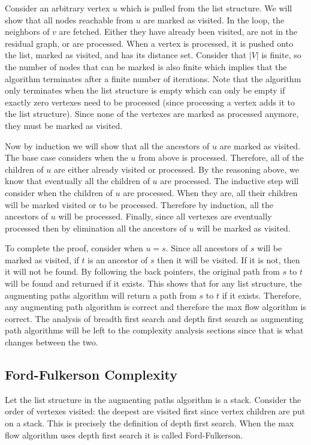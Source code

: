 \documentclass{article}
\begin{document}
Consider an arbitrary vertex $u$ which is pulled from the list structure. We will show that all nodes reachable from $u$ are marked as visited. In the loop, the neighbors of $v$ are fetched. Either they have already been visited, are not in the residual graph, or are processed. When a vertex is processed, it is pushed onto the list, marked as visited, and has its distance set. Consider that $|V|$ is finite, so the number of nodes that can be marked is also finite which implies that the algorithm terminates after a finite number of iterations. Note that the algorithm only terminates when the list structure is empty which can only be empty if exactly zero vertexes need to be processed (since processing a vertex adds it to the list structure). Since none of the vertexes are marked as processed anymore, they must be marked as visited.

Now by induction we will show that all the ancestors of $u$ are marked as visited. The base case considers when the $u$ from above is processed. Therefore, all of the children of $u$ are either already visited or processed. By the reasoning above, we know that eventually all the children of $u$ are processed. The inductive step will consider when the children of $u$ are processed. When they are, all their children will be marked visited or to be processed. Therefore by induction, all the ancestors of $u$ will be processed. Finally, since all vertexes are eventually processed then by elimination all the ancestors of $u$ will be marked as visited.

To complete the proof, consider when $u=s$. Since all ancestors of $s$ will be marked as visited, if $t$ is an ancestor of $s$ then it will be visited. If it is not, then it will not be found. By following the back pointers, the original path from $s$ to $t$ will be found and returned if it exists. This shows that for any list structure, the augmenting paths algorithm will return a path from $s$ to $t$ if it exists. Therefore, any augmenting path algorithm is correct and therefore the max flow algorithm is correct. The analysis of breadth first search and depth first search as augmenting path algorithms will be left to the complexity analysis sections since that is what changes between the two.

\subsection{Ford-Fulkerson Complexity}
Let the list structure in the augmenting paths algorithm is a stack. Consider the order of vertexes visited: the deepest are visited first since vertex children are put on a stack. This is precisely the definition of depth first search. When the max flow algorithm uses depth first search it is called Ford-Fulkerson.
\end{document}
